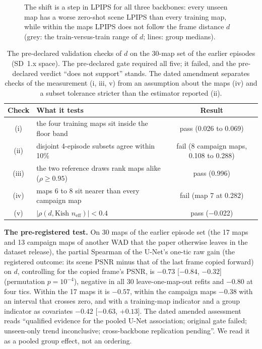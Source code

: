 \begin{figure}[ht]
\centering
{}
\caption{The shift is a step in LPIPS for all three backbones: every unseen map has a worse zero-shot scene LPIPS than every training map, while within the maps LPIPS does not follow the frame distance $d$ (grey: the train-versus-train range of $d$; lines: group medians).}
\label{fig:step-lpips}
\end{figure}

\begin{table}[ht]
\centering\footnotesize\setlength{\tabcolsep}{4pt}
\caption{The pre-declared validation checks of $d$ on the 30-map set of the earlier episodes (SD~1.x space). The pre-declared gate required all five; it failed, and the pre-declared verdict ``does not support'' stands. The dated amendment separates checks of the measurement (i, iii, v) from an assumption about the maps (iv) and a subset tolerance stricter than the estimator reported (ii).}
\label{tab:checks}
\begin{tabular}{clc}
\toprule
Check & What it tests & Result \\
\midrule
(i) & the four training maps sit inside the floor band & pass (0.026 to 0.069) \\
(ii) & disjoint 4-episode subsets agree within 10\% & fail (8 campaign maps, 0.108 to 0.288) \\
(iii) & the two reference draws rank maps alike ($\rho\ge0.95$) & pass (0.996) \\
(iv) & maps 6 to 8 sit nearer than every campaign map & fail (map 7 at 0.282) \\
(v) & $|\rho(d,\text{Kish }n_\text{eff})|<0.4$ & pass ($-$0.022) \\
\bottomrule
\end{tabular}
\end{table}

\textbf{The pre-registered test.} On 30 maps of the earlier episode set (the 17 maps and 13 campaign maps of another WAD that the paper otherwise leaves in the dataset release), the partial Spearman of the U-Net's one-tic raw gain (the registered outcome: its scene PSNR minus that of the last frame copied forward) on $d$, controlling for the copied frame's PSNR, is $-0.73$ [$-0.84$, $-0.32$] (permutation $p=10^{-4}$), negative in all 30 leave-one-map-out refits and $-0.80$ at four tics. Within the 17 maps it is $-0.57$, within the campaign maps $-0.38$ with an interval that crosses zero, and with a training-map indicator and a group indicator as covariates $-0.42$ [$-0.63$, $+0.13$]. The dated amended assessment reads ``qualified evidence for the pooled U-Net association; original gate failed; unseen-only trend inconclusive; cross-backbone replication pending''. We read it as a pooled group effect, not an ordering.

